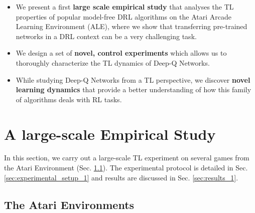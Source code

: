 \begin{itemize}
	\item We present a first \textbf{large scale empirical study} that analyses the TL properties of popular model-free DRL algorithms on the Atari Arcade Learning Environment (ALE), where we show that transferring pre-trained networks in a DRL context can be a very challenging task.
	\item We design a set of \textbf{novel, control experiments} which allows us to thoroughly characterize the TL dynamics of Deep-Q Networks.
	\item While studying Deep-Q Networks from a TL perspective, we discover \textbf{novel learning dynamics} that provide a better understanding of how this family of algorithms deals with RL tasks.  
\end{itemize}


\section{A large-scale Empirical Study}
\label{sec:empirical_study}

In this section, we carry out a large-scale TL experiment on several games from the Atari Environment (Sec. \ref{sec:atari_environments}). The experimental protocol is detailed in Sec. \ref{sec:experimental_setup_1} and results are discussed in Sec. \ref{sec:results_1}.

\subsection{The Atari Environments}
\label{sec:atari_environments}


